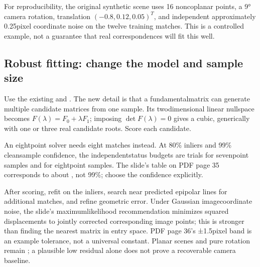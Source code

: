 \documentclass[letterpaper,11pt,english,openany,oneside]{jupyterBook}
\begin{document}
\begin{TextbookBox}
\sphinxAtStartPar
For reproducibility, the original synthetic scene uses 16 noncoplanar points, a 9° camera rotation, translation \((-0.8,0.12,0.05)^T\), and independent approximately 0.25\sphinxhyphen{}pixel coordinate noise on the twelve training matches. This is a controlled example, not a guarantee that real correspondences will fit this well.

\end{TextbookBox}


\subsection{Robust fitting: change the model and sample size}
\label{\detokenize{lectures/lecture04/estimation:robust-fitting-change-the-model-and-sample-size}}
\sphinxAtStartPar
Use the existing {\hyperref[\detokenize{lectures/lecture02/estimation::doc}]{}} and {\hyperref[\detokenize{lectures/lecture03/probability-ransac::doc}]{}}. The new detail is that a fundamental\sphinxhyphen{}matrix  can generate multiple candidate matrices from one sample. Its two\sphinxhyphen{}dimensional linear nullspace becomes \(F(\lambda)=F_0+\lambda F_1\); imposing \(\det F(\lambda)=0\) gives a cubic, generically with one or three real candidate roots. Score each candidate.

\sphinxAtStartPar
An eight\sphinxhyphen{}point solver needs eight matches instead. At 80\% inliers and 99\% clean\sphinxhyphen{}sample confidence, the independent\sphinxhyphen{}status budgets are  trials for seven\sphinxhyphen{}point samples and  for eight\sphinxhyphen{}point samples. The slide’s table on PDF page 35 corresponds to about , not 99\%; choose the confidence explicitly.

\sphinxAtStartPar
After scoring, refit on the inliers, search near predicted epipolar lines for additional matches, and refine geometric error. Under Gaussian image\sphinxhyphen{}coordinate noise, the slide’s maximum\sphinxhyphen{}likelihood recommendation minimizes squared displacements to jointly corrected corresponding image points; this is stronger than finding the nearest matrix in entry space. PDF page 36’s ±1.5\sphinxhyphen{}pixel band is an example tolerance, not a universal constant. Planar scenes and pure rotation remain {\hyperref[\detokenize{lectures/lecture02/two-view::doc}]{}}; a plausible low residual alone does not prove a recoverable camera baseline.
\end{document}
